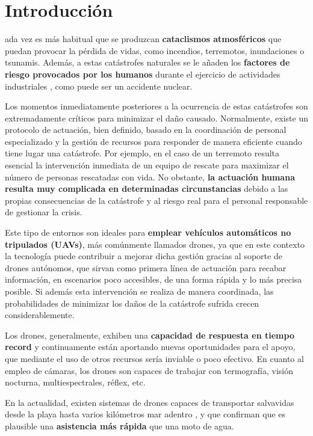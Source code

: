 \chapter{Introducción}
\label{chap:introduccion}

ada vez es más habitual que se produzcan \textbf{cataclismos atmosféricos} \cite{desastres} que puedan provocar la pérdida de vidas, como incendios, terremotos, inundaciones o tsunamis. Además, a estas catástrofes naturales se le añaden los \textbf{factores de riesgo provocados por los humanos} durante el ejercicio de actividades industriales \cite{desastres}, como puede ser un accidente nuclear.
  
Los momentos inmediatamente posteriores a la ocurrencia de estas catástrofes son extremadamente críticos para minimizar el daño causado. Normalmente, existe un protocolo de actuación, bien definido, basado en la coordinación de personal especializado y la gestión de recursos para responder de manera eficiente cuando tiene lugar una catástrofe. Por ejemplo, en el caso de un terremoto resulta esencial la intervención inmediata de un equipo de rescate para maximizar el número de personas rescatadas con vida. No obstante, \textbf{la actuación humana resulta muy complicada en determinadas circunstancias} debido a las propias consecuencias de la catástrofe y al riesgo real para el personal responsable de gestionar la crisis.

Este tipo de entornos son ideales para \textbf{emplear vehículos automáticos no tripulados (\acs{UAV}s)}, más comúnmente llamados drones, ya que en este contexto la tecnología puede contribuir a mejorar dicha gestión gracias al soporte de drones autónomos, que sirvan como primera línea de actuación para recabar información, en escenarios poco accesibles, de una forma rápida y lo más precisa posible. Si además esta intervención se realiza de manera coordinada, las probabilidades de minimizar los daños de la catástrofe sufrida crecen considerablemente.

Los drones, generalmente, exhiben una \textbf{capacidad de respuesta en tiempo record} y continuamente están aportando nuevas oportunidades para el apoyo, que mediante el uso de otros recursos sería inviable o poco efectivo. En cuanto al empleo de cámaras, los drones son capaces de trabajar con termografía, visión nocturna, multiespectrales, réflex, etc.

En la actualidad, existen sistemas de drones capaces de transportar salvavidas desde la playa hasta varios kilómetros mar adentro \cite{dronsocorrista}, y que confirman que es plausible una \textbf{asistencia más rápida} que una moto de agua.

